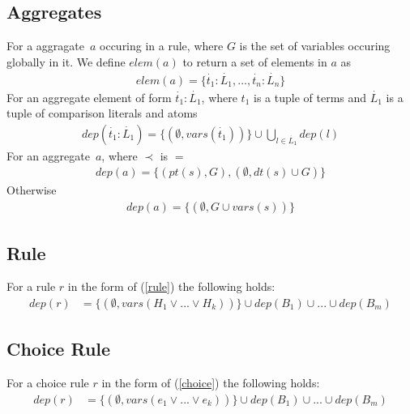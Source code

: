 \documentclass{article}
\newcommand{\tuple}[1]{\dot{#1}}
\newcommand{\set}[1]{\{#1\}}
\begin{document}
	\subsection{Aggregates}
	For a aggragate~$a$ occuring in a rule, where $G$ is the set of variables occuring globally in it.
	We define $elem(a)$ to return a set of elements in $a$ as
	\begin{align*}
		elem(a) = \set{\tuple{t_1} : \tuple{L_1}, \dots , \tuple{t_n} : \tuple{L_n}}
	\end{align*}
	For an aggregate element of form $\tuple{t_1} : \tuple{L_1}$, where $t_1$ is a tuple of terms and $\tuple{L_1}$ is a tuple of comparison literals and atoms
	\begin{align*}
		dep(\tuple{t_1} : \tuple{L_1}) = \set{(\emptyset, vars(\tuple{t_1}))} \cup \bigcup_{l \in \tuple{L_1}} dep(l)
	\end{align*}
	For an aggregate~$a$, where $\prec$ is $=$
	\begin{align*}
		dep(a) = \set{(pt(s), G), (\emptyset, dt(s) \cup G)}
	\end{align*}
	Otherwise
	\begin{align*}
		dep(a) = \set{(\emptyset, G \cup vars(s))}
	\end{align*}

	\subsection{Rule}
	For a rule $r$ in the form of (\ref{rule}) the following holds:
	\begin{align*}
		dep(r) &= \set{(\emptyset, vars(H_1\vee ... \vee H_k))} \cup dep(B_1) \cup ... \cup dep(B_m)
	\end{align*}

	\subsection{Choice Rule}
	For a choice rule $r$ in the form of (\ref{choice}) the following holds:
	\begin{align*}
		dep(r) &= \set{(\emptyset, vars(e_1\vee ... \vee e_k))} \cup dep(B_1) \cup ... \cup dep(B_m)
	\end{align*}
\end{document}
